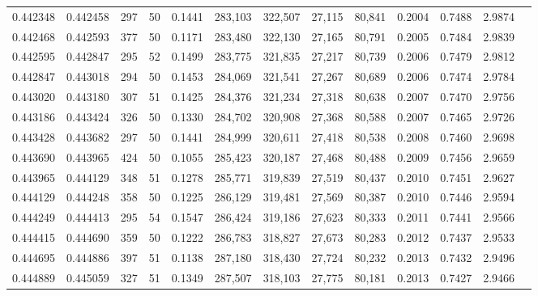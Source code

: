 \begin{tabular}{rrrrrrrrrrrrr}
0.442348 & 0.442458 &   297 &  50 &                                     0.1441 & 283,103 & 322,507 &  27,115 &  80,841 & 0.2004 & 0.7488 & 2.9874 \\
0.442468 & 0.442593 &   377 &  50 &                                     0.1171 & 283,480 & 322,130 &  27,165 &  80,791 & 0.2005 & 0.7484 & 2.9839 \\
0.442595 & 0.442847 &   295 &  52 &                                     0.1499 & 283,775 & 321,835 &  27,217 &  80,739 & 0.2006 & 0.7479 & 2.9812 \\
0.442847 & 0.443018 &   294 &  50 &                                     0.1453 & 284,069 & 321,541 &  27,267 &  80,689 & 0.2006 & 0.7474 & 2.9784 \\
0.443020 & 0.443180 &   307 &  51 &                                     0.1425 & 284,376 & 321,234 &  27,318 &  80,638 & 0.2007 & 0.7470 & 2.9756 \\
0.443186 & 0.443424 &   326 &  50 &                                     0.1330 & 284,702 & 320,908 &  27,368 &  80,588 & 0.2007 & 0.7465 & 2.9726 \\
0.443428 & 0.443682 &   297 &  50 &                                     0.1441 & 284,999 & 320,611 &  27,418 &  80,538 & 0.2008 & 0.7460 & 2.9698 \\
0.443690 & 0.443965 &   424 &  50 &                                     0.1055 & 285,423 & 320,187 &  27,468 &  80,488 & 0.2009 & 0.7456 & 2.9659 \\
0.443965 & 0.444129 &   348 &  51 &                                     0.1278 & 285,771 & 319,839 &  27,519 &  80,437 & 0.2010 & 0.7451 & 2.9627 \\
0.444129 & 0.444248 &   358 &  50 &                                     0.1225 & 286,129 & 319,481 &  27,569 &  80,387 & 0.2010 & 0.7446 & 2.9594 \\
0.444249 & 0.444413 &   295 &  54 &                                     0.1547 & 286,424 & 319,186 &  27,623 &  80,333 & 0.2011 & 0.7441 & 2.9566 \\
0.444415 & 0.444690 &   359 &  50 &                                     0.1222 & 286,783 & 318,827 &  27,673 &  80,283 & 0.2012 & 0.7437 & 2.9533 \\
0.444695 & 0.444886 &   397 &  51 &                                     0.1138 & 287,180 & 318,430 &  27,724 &  80,232 & 0.2013 & 0.7432 & 2.9496 \\
0.444889 & 0.445059 &   327 &  51 &                                     0.1349 & 287,507 & 318,103 &  27,775 &  80,181 & 0.2013 & 0.7427 & 2.9466 \\

\end{tabular}
